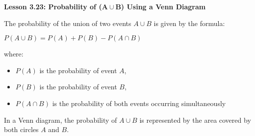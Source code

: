 \begin{center}
\textbf{Lesson 3.23: Probability of (\(\mathbf{A \cup B}\)) Using a Venn Diagram}
\end{center}

\vspace*{-1.5ex}

\noindent The probability of the union of two events \( A \cup B \) is given by the formula:

{\centering $ 
P(A \cup B) = P(A) + P(B) - P(A \cap B)
 $\par}

\noindent where:
\begin{itemize}
    \item \( P(A) \) is the probability of event \( A \),
    \item \( P(B) \) is the probability of event \( B \),
    \item \( P(A \cap B) \) is the probability of both events occurring simultaneously%
\end{itemize}

In a Venn diagram, the probability of \( A \cup B \) is represented by the area covered by both circles \( A \) and \( B \).


